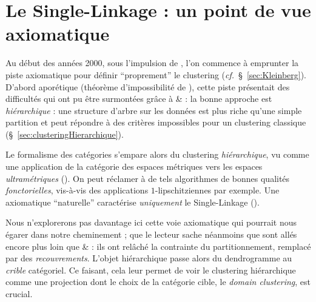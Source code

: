 \chapter{Le Single-Linkage : un point de vue axiomatique}
\label{chap:axiomatique}


Au début des années 2000, sous l'impulsion de  \cite{Kleinberg2002}, l'on commence à emprunter la piste axiomatique pour définir ``proprement'' le clustering (\emph{cf.}~\S~\ref{sec:Kleinberg}). 
D'abord aporétique (théorème d'impossibilité de  \cite{Kleinberg2002}), cette piste présentait des difficultés qui ont pu être surmontées grâce à  \&  \cite{CarlssonMemoli2010} : la bonne approche est \emph{hiérarchique} : une structure d'arbre sur les données est plus riche qu'une simple partition et peut répondre à des critères impossibles pour un clustering classique (\S~\ref{sec:clusteringHierarchique}).

Le formalisme des catégories s'empare alors du clustering \emph{hiérarchique}, vu comme une application de la catégorie des espaces métriques vers les espaces \emph{ultramétriques} ().
On peut réclamer à de tels algorithmes de bonnes qualités \emph{fonctorielles}, vis-à-vis des applications $1$-lipschitziennes par exemple. Une axiomatique ``naturelle'' caractérise \emph{uniquement} le Single-Linkage ().

Nous n'explorerons pas davantage ici cette voie axiomatique qui pourrait nous égarer dans notre cheminement ; que le lecteur sache néanmoins que  \cite{CulbertsonGuralnikStiller2018} sont allés encore plus loin que  \&  : ils ont relâché la contrainte du partitionnement, remplacé par des \emph{recouvrements}. L'objet hiérarchique passe alors du dendrogramme au \emph{crible} catégoriel.
Ce faisant, cela leur permet de voir le clustering hiérarchique comme une projection dont le choix de la catégorie cible, le \emph{domain clustering}, est crucial.




